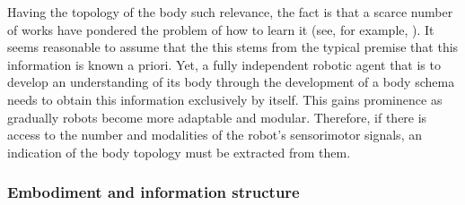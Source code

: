 Having the topology of the body such relevance, the fact is that a scarce number of works have pondered the problem of how to learn it (see, for example, \cite{Bongard2006Resilientmachinescontinuous}). It seems reasonable to assume that the this stems from the typical premise that this information is known a priori. Yet, a fully independent robotic agent that is to develop an understanding of its body through the development of a body schema needs to obtain this information exclusively by itself. This gains prominence as gradually robots become more adaptable and modular. Therefore, if there is access to the number and modalities of the robot's sensorimotor signals, an indication of the body topology must be extracted from them.%

\subsubsection{Embodiment and information structure}\label{sec:embodiment_and_information}
%
